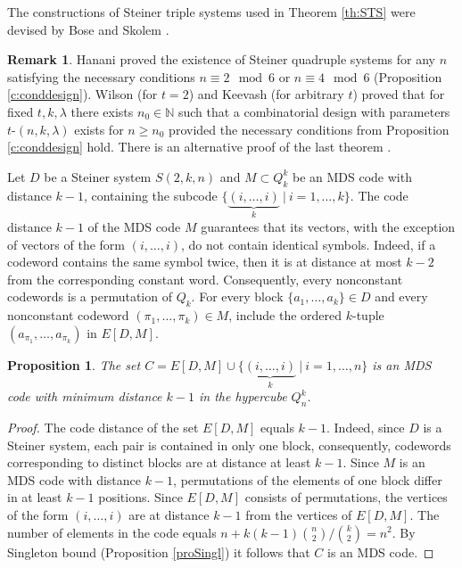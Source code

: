\documentclass[11pt]{article}
\newtheorem{claim}{Proposition}[section]
\theoremstyle{definition}
\newtheorem{remark}{Remark}[section]
\begin{document}
{{{The constructions of Steiner triple systems used in Theorem \ref{th:STS} were devised by
Bose \cite{Bose} and Skolem \cite{Skolem}.

\begin{remark}\label{rm:Keevash}
 Hanani \cite{Hanani} proved the existence of Steiner quadruple
systems for any $n$ satisfying the necessary conditions
$n\equiv 2\mod 6$ or $n\equiv 4\mod 6$ (Proposition
\ref{c:conddesign}). Wilson \cite{Wilson} (for $t=2$) and Keevash
\cite{Keevash14} (for arbitrary $t$)
 proved that for  fixed
$t,k,\lambda$ there exists $n_0\in \mathbb{N}$ such that a combinatorial
design with parameters $t$-$(n,k,\lambda)$ exists for $n\geq n_0$
provided the necessary conditions from Proposition \ref{c:conddesign} hold. There is an alternative proof of the last theorem \cite{Glock}.
\end{remark}

Let $D$ be a Steiner system $S(2,k,n)$ and $M\subset Q_k^k$ be an
{\rm MDS} code with distance $k-1$, containing the subcode
$\{\underbrace{(i,\dots,i)}_{k} \ |\ i=1,\dots,k\}$. The code
distance $k-1$ of the MDS code $M$ guarantees that its vectors, with the
exception of vectors of the form $(i,\dots,i)$, do not
contain identical symbols. 
Indeed, if a codeword contains the same symbol twice, then it is at distance at most $k-2$ from the corresponding constant word.
Consequently, every nonconstant codewords is a permutation of $Q_k$. 
For every block 
 $\{a_1,\dots,a_k\}\in D$ and every nonconstant codeword $(\pi_1,\dots,\pi_k)\in M$, include the ordered $k$-tuple $(a_{\pi_1},\dots,a_{\pi_k})$ in $E[D,M]$. 


\begin{claim}\label{e:SteMDS}
The set $C=E[D,M]\cup \{\underbrace{(i,\dots,i)}_{k} \ |\
i=1,\dots,n\}$ is an {\rm MDS} code with minimum distance $k-1$ in the
hypercube $Q^k_n$.\end{claim}
\begin{proof}
The code distance of the set $E[D,M]$ equals $k-1$.
Indeed, since $D$
is a Steiner system, each pair is contained in only one
block, consequently, codewords corresponding to distinct blocks are at distance at least $k-1$.
Since $M$ is an {\rm MDS} code with distance $k-1$, 
permutations of the elements of one block differ in at least $k-1$
positions. Since $E[D,M]$ consists of permutations, the vertices
of the form $(i,\dots,i)$ are at distance $k-1$ from the vertices of
$E[D,M]$.
 The number
of elements in the code equals $n+k(k-1){n \choose 2}/{k \choose 2}=n^2$. By Singleton bound (Proposition \ref{proSingl}) it follows that $C$
is an {\rm MDS} code.
\end{proof}

}}}
\end{document}
